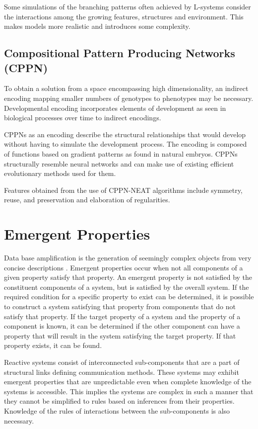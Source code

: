 Some simulations of the branching patterns often achieved by L-systems consider the interactions among the growing features, structures and environment. This makes models more realistic and introduces some complexity. \citep{Prusinkiewicz2004}

\subsection{Compositional Pattern Producing Networks (CPPN)}

To obtain a solution from a space encompassing high dimensionality, an indirect encoding mapping smaller numbers of genotypes to phenotypes may be necessary. Developmental encoding incorporates elements of development as seen in biological processes over time to indirect encodings. \citep{Hornby2001}

CPPNs as an encoding describe the structural relationships that would develop without having to simulate the development process. The encoding is composed of functions based on gradient patterns as found in natural embryos. CPPNs structurally resemble neural networks and can make use of existing efficient evolutionary methods used for them. \citep{Stanley2006}

Features obtained from the use of CPPN-NEAT algorithms include symmetry, reuse, and preservation and elaboration of regularities. \citep{Stanley2006}

\section{Emergent Properties}

Data base amplification is the generation of seemingly complex objects from very concise descriptions \citep{Prusinkiewicz2004}. Emergent properties occur when not all components of a given property satisfy that property. An emergent property is not satisfied by the constituent components of a system, but is satisfied by the overall system. If the required condition for a specific property to exist can be determined, it is possible to construct a system satisfying that property from components that do not satisfy that property. If the target property of a system and the property of a component is known, it can be determined if the other component can have a property that will result in the system satisfying the target property. If that property exists, it can be found. \citep{Zakinthinos1998}

Reactive systems consist of interconnected sub-components that are a part of structural links defining communication methods. These systems may exhibit emergent properties that are unpredictable even when complete knowledge of the systems is accessible. This implies the systems are complex in such a manner that they cannot be simplified to rules based on inferences from their properties. Knowledge of the rules of interactions between the sub-components is also necessary. \citep{Aiguier2008}

